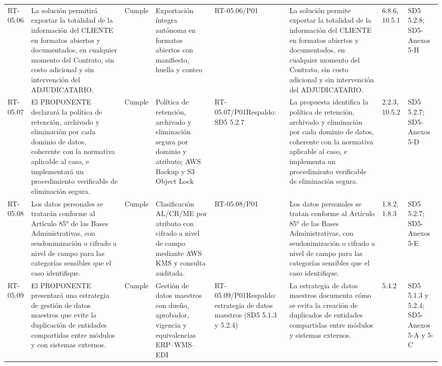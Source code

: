 \documentclass[oficio,firma,final]{lafrox}
\begin{document}
\begin{landscape}
{\begin{longtable}{@{}F{0.054} F{0.173} F{0.061} F{0.191} F{0.106} F{0.180} F{0.067} F{0.168}@{}}
  RT-05.06 & La solución permitirá exportar la totalidad de la información del CLIENTE en formatos abiertos y documentados, en cualquier momento del Contrato, sin costo adicional y sin intervención del ADJUDICATARIO. & Cumple & Exportación íntegra autónoma en formatos abiertos con manifiesto, huella y conteo & RT-05.06/\allowbreak{}P01 & La solución permite exportar la totalidad de la información del CLIENTE en formatos abiertos y documentados, en cualquier momento del Contrato, sin costo adicional y sin intervención del ADJUDICATARIO. & 6.8.6, 10.5.1 & SD5 5.2.8; SD5-Anexos 5-H  \\
  RT-05.07 & El PROPONENTE declarará la política de retención, archivado y eliminación por cada dominio de datos, coherente con la normativa aplicable al caso, e implementará un procedimiento verificable de eliminación segura. & Cumple & Política de retención, archivado y eliminación segura por dominio y atributo; AWS Backup y S3 Object Lock & RT-05.07/\allowbreak{}P01\newline Respaldo: SD5 5.2.7 & La propuesta identifica la política de retención, archivado y eliminación por cada dominio de datos, coherente con la normativa aplicable al caso, e implementa un procedimiento verificable de eliminación segura. & 2.2.3, 10.5.2 & SD5 5.2.7; SD5-Anexos 5-D  \\
  RT-05.08 & Los datos personales se tratarán conforme al Artículo 85° de las Bases Administrativas, con seudonimización o cifrado a nivel de campo para las categorías sensibles que el caso identifique. & Cumple & Clasificación AL/CR/ME por atributo con cifrado a nivel de campo mediante AWS KMS y consulta auditada. & RT-05.08/\allowbreak{}P01 & Los datos personales se tratan conforme al Artículo 85° de las Bases Administrativas, con seudonimización o cifrado a nivel de campo para las categorías sensibles que el caso identifique. & 1.8.2, 1.8.3 & SD5 5.2.7; SD5-Anexos 5-E  \\
  RT-05.09 & El PROPONENTE presentará una estrategia de gestión de datos maestros que evite la duplicación de entidades compartidas entre módulos y con sistemas externos. & Cumple & Gestión de datos maestros con dueño, aprobador, vigencia y equivalencias ERP–WMS–EDI & RT-05.09/\allowbreak{}P01\newline Respaldo: estrategia de datos maestros (SD5 5.1.3 y 5.2.4) & La estrategia de datos maestros documenta cómo se evita la creación de duplicados de entidades compartidas entre módulos y sistemas externos. & 5.4.2 & SD5 5.1.3 y 5.2.4; SD5-Anexos 5-A y 5-C  \\

\end{longtable}}
\end{landscape}
\end{document}
